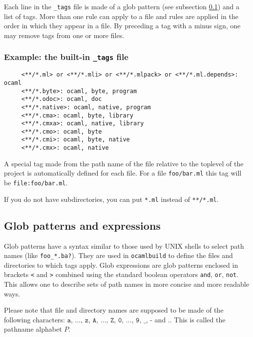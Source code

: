 \documentclass[9pt]{article}
\newcommand{\ocb}{\texttt{ocamlbuild}\xspace}
\newcommand{\tags}{\texttt{\_tags}\xspace}
\begin{document}
Each line in the \tags file is made of a glob pattern (see subsection
\ref{subsec:glob}) and a list of tags.  More than one rule can apply to a file
and rules are applied in the order in which they appear in a file.
By preceding a tag with a minus sign, one may remove tags from one or more files.

\subsubsection{Example: the built-in \tags file}
\begin{verbatim}
     <**/*.ml> or <**/*.mli> or <**/*.mlpack> or <**/*.ml.depends>: ocaml
     <**/*.byte>: ocaml, byte, program
     <**/*.odoc>: ocaml, doc
     <**/*.native>: ocaml, native, program
     <**/*.cma>: ocaml, byte, library
     <**/*.cmxa>: ocaml, native, library
     <**/*.cmo>: ocaml, byte
     <**/*.cmi>: ocaml, byte, native
     <**/*.cmx>: ocaml, native
\end{verbatim}

A special tag made from the path name of the file relative to the toplevel
of the project is automatically defined for each file.  For a file
\texttt{foo/bar.ml} this tag will be \texttt{file:foo/bar.ml}.

If you do not have subdirectories, you can put \texttt{*.ml} instead of
\texttt{**/*.ml}.
\subsection{Glob patterns and expressions}
\label{subsec:glob}
Glob patterns have a syntax similar to those used by UNIX shells to select path
names (like \texttt{foo\_*.ba?}).  They are used in \ocb to define the files
and directories to which tags apply.  Glob expressions are glob patterns
enclosed in brackets \texttt{<} and \texttt{>} combined using the standard
boolean operators \texttt{and}, \texttt{or}, \texttt{not}.  This allows one to
describe sets of path names in more concise and more readable ways.

Please note that file and directory names are supposed to be made of the
following characters: $\texttt{a}$, $\dots$, $\texttt{z}$, $\texttt{A}$,
$\dots$, $\texttt{Z}$, $\texttt{0}$, $\dots$, $\texttt{9}$, $\texttt{\_}$,
$\texttt{-}$ and $\texttt{.}$.  This is called the pathname alphabet $P$.
\end{document}
